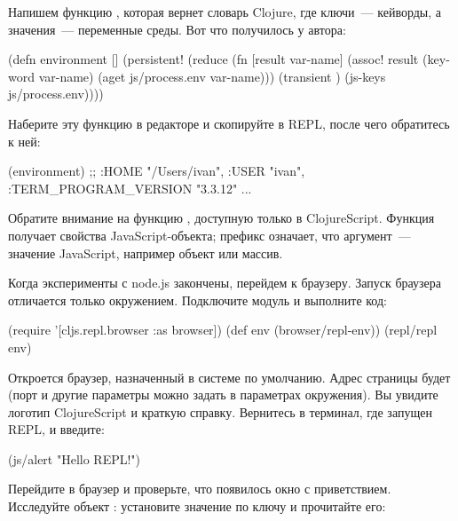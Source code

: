 Напишем функцию , которая вернет словарь Clojure, где ключи~--- кейворды, а значения~--- переменные среды. Вот что получилось у автора:

\begin{english}
  \begin{clojure}
(defn environment []
  (persistent!
   (reduce
    (fn [result var-name]
      (assoc! result
              (keyword var-name)
              (aget js/process.env var-name)))
    (transient {})
    (js-keys js/process.env))))
  \end{clojure}
\end{english}

Наберите эту функцию в редакторе и скопируйте в REPL, после чего обратитесь к ней:

\begin{english}
  \begin{clojure}
(environment)
;; {:HOME "/Users/ivan", :USER "ivan", :TERM_PROGRAM_VERSION "3.3.12" ...}
  \end{clojure}
\end{english}

Обратите внимание на функцию , доступную только в ClojureScript. Функция получает свойства JavaScript-объекта; префикс  означает, что аргумент~--- значение JavaScript, например объект или массив.

Когда эксперименты с node.js закончены, перейдем к браузеру. Запуск браузера отличается только окружением. Подключите модуль  и выполните код:

\begin{english}
  \begin{clojure}
(require '[cljs.repl.browser :as browser])
(def env (browser/repl-env))
(repl/repl env)
  \end{clojure}
\end{english}

Откроется браузер, назначенный в системе по умолчанию. Адрес страницы будет  (порт и другие параметры можно задать в параметрах окружения). Вы увидите логотип ClojureScript и краткую справку. Вернитесь в терминал, где запущен REPL, и введите:

\begin{english}
  \begin{clojure}
(js/alert "Hello REPL!")
  \end{clojure}
\end{english}

Перейдите в браузер и проверьте, что появилось окно с приветствием. Исследуйте объект : установите значение по ключу и прочитайте его:

